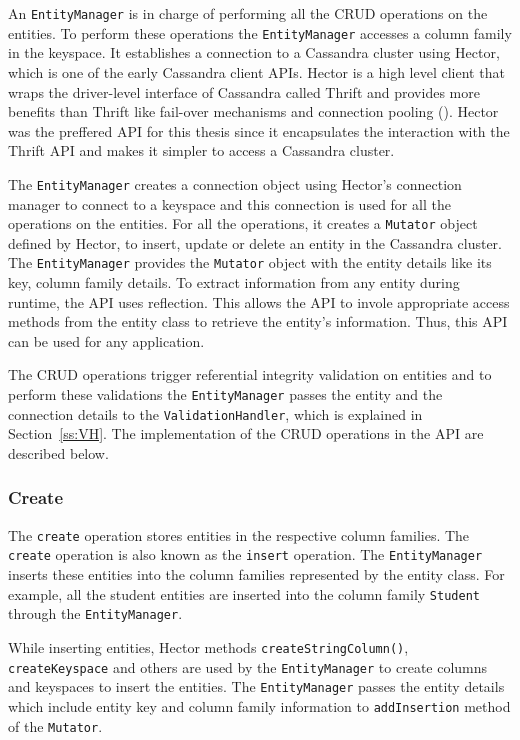 	An \texttt{EntityManager} is in charge of performing all the \ac{CRUD}
	operations on the entities. To perform these
	operations  the \texttt{EntityManager}
	accesses a column family in the keyspace. It establishes a connection
	to a Cassandra cluster using Hector, which is one of the 
	 early Cassandra client \acp{API}.  Hector is a high level
	client that wraps the driver-level interface of Cassandra called Thrift and
	provides more benefits than Thrift like fail-over mechanisms and connection
	pooling ().  Hector was the preffered \ac{API} for this thesis
	since it encapsulates the interaction with the Thrift \ac{API} and makes it
	simpler to access a Cassandra cluster.
			
	The \texttt{EntityManager} creates a connection object
	using Hector's  connection manager to connect to a keyspace and this connection
	is used for all the operations on the entities.  For all the operations,
	it creates a \texttt{Mutator} object defined by Hector,  to
	insert,  update or delete an entity in the Cassandra cluster. The
	\texttt{EntityManager} provides the \texttt{Mutator} object with the entity
	details like its key, column family details. To extract  information
	from any entity during runtime, the \ac{API} uses reflection. This allows
	the \ac{API} to invole appropriate access methods from the entity class to
	retrieve the entity's information.
	Thus, this \ac{API} can be used for any application.
 	
	The \ac{CRUD} operations trigger  referential
	integrity validation on entities and to
	perform these validations the \texttt{EntityManager} passes the
	entity and the connection details to the \texttt{ValidationHandler},
	which is explained in Section~\ref{ss:VH}.
	The implementation of the \ac{CRUD} operations in the \ac{API} are described
	below.
	
		\subsubsection{Create}
		 The \texttt{create} operation stores entities in the respective column
		families. The \texttt{create} operation is also known as the
		\texttt{insert} operation. The \texttt{EntityManager} inserts these entities
		into the column families represented by the entity class.  
		For example,  all the student entities are inserted into the column family
		\texttt{Student} through the \texttt{EntityManager}. 
		
		While inserting entities,  Hector methods \texttt{createStringColumn()}, 
		\texttt{createKeyspace} and others are used by the \texttt{EntityManager} to
		create columns and keyspaces to insert the entities. The
		\texttt{EntityManager} passes the entity details which include entity key and
		column family information to \texttt{addInsertion} method of the \texttt{Mutator}.

